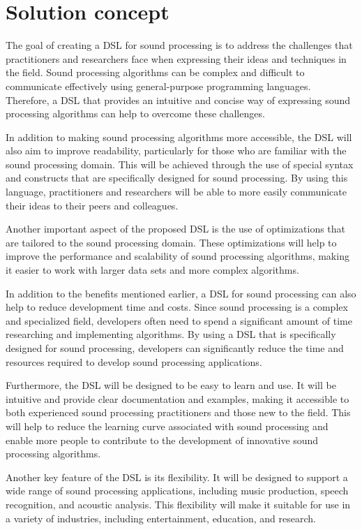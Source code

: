 \section{Solution concept} 
The goal of creating a DSL for sound processing is to address the challenges that practitioners and researchers face when expressing their ideas and techniques in the field. Sound processing algorithms can be complex and difficult to communicate effectively using general-purpose programming languages. Therefore, a DSL that provides an intuitive and concise way of expressing sound processing algorithms can help to overcome these challenges.

In addition to making sound processing algorithms more accessible, the DSL will also aim to improve readability, particularly for those who are familiar with the sound processing domain. This will be achieved through the use of special syntax and constructs that are specifically designed for sound processing. By using this language, practitioners and researchers will be able to more easily communicate their ideas to their peers and colleagues.

Another important aspect of the proposed DSL is the use of optimizations that are tailored to the sound processing domain. These optimizations will help to improve the performance and scalability of sound processing algorithms, making it easier to work with larger data sets and more complex algorithms.

In addition to the benefits mentioned earlier, a DSL for sound processing can also help to reduce development time and costs. Since sound processing is a complex and specialized field, developers often need to spend a significant amount of time researching and implementing algorithms. By using a DSL that is specifically designed for sound processing, developers can significantly reduce the time and resources required to develop sound processing applications.

Furthermore, the DSL will be designed to be easy to learn and use. It will be intuitive and provide clear documentation and examples, making it accessible to both experienced sound processing practitioners and those new to the field. This will help to reduce the learning curve associated with sound processing and enable more people to contribute to the development of innovative sound processing algorithms.

Another key feature of the DSL is its flexibility. It will be designed to support a wide range of sound processing applications, including music production, speech recognition, and acoustic analysis. This flexibility will make it suitable for use in a variety of industries, including entertainment, education, and research.

